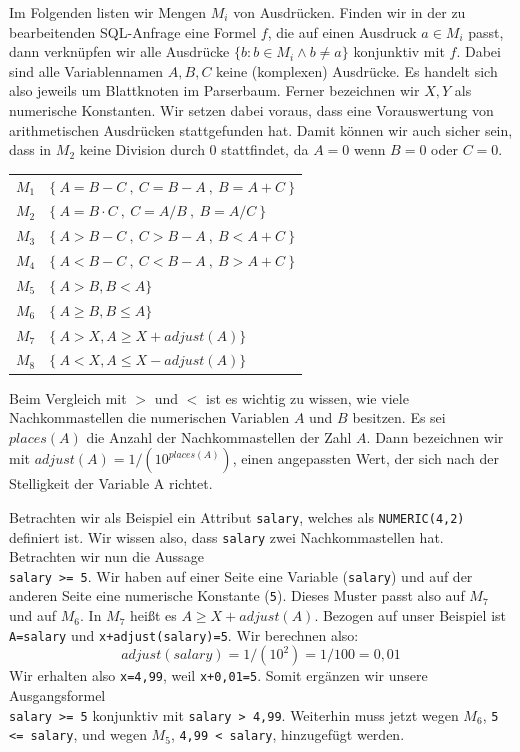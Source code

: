 Im Folgenden listen wir Mengen $M_i$ von Ausdrücken. Finden wir in der zu bearbeitenden SQL-Anfrage eine Formel $f$, die auf einen Ausdruck $a\in M_i$ passt, dann verknüpfen wir alle Ausdrücke $\{b : b\in M_i \wedge b \neq a\}$ konjunktiv mit $f$. Dabei sind alle Variablennamen $A,B,C$ keine (komplexen) Ausdrücke. Es handelt sich also jeweils um Blattknoten im Parserbaum. Ferner bezeichnen wir $X,Y$ als numerische Konstanten. Wir setzen dabei voraus, dass eine Vorauswertung von arithmetischen Ausdrücken stattgefunden hat. Damit können wir auch sicher sein, dass in $M_2$ keine Division durch 0 stattfindet, da $A=0$ wenn $B=0$ oder $C=0$.\\

\begin{tabular}{ll}
$M_1$ & $\{\ A=B-C\ ,\ C=B-A\ ,\ B=A+C\ \}$\\
$M_2$ & $\{\ A=B\cdot C\ ,\ C=A / B\ ,\ B=A / C\ \}$\\
$M_3$ & $\{\ A>B-C\ ,\ C>B-A\ ,\ B<A+C\ \}$\\
$M_4$ & $\{\ A<B-C\ ,\ C<B-A\ ,\ B>A+C\ \}$\\
$M_5$ & $\{\ A>B, B<A \}$\\
$M_6$ & $\{\ A\geq B, B\leq A \}$\\
$M_7$ & $\{\ A>X, A\geq X+\mathit{adjust}(A) \}$\\
$M_8$ & $\{\ A<X, A\leq X-\mathit{adjust}(A) \}$\\

\end{tabular}

Beim Vergleich mit $>$ und $<$ ist es wichtig zu wissen, wie viele Nachkommastellen die numerischen Variablen $A$ und $B$ besitzen. Es sei $\mathit{places}(A)$ die Anzahl der Nachkommastellen der Zahl $A$. Dann bezeichnen wir mit $\mathit{adjust}(A) = 1 / (10^{\mathit{places}(A)})$, einen angepassten Wert, der sich nach der Stelligkeit der Variable A richtet.

Betrachten wir als Beispiel ein Attribut \verb|salary|, welches als \verb|NUMERIC(4,2)| definiert ist. Wir wissen also, dass \verb|salary| zwei Nachkommastellen hat. Betrachten wir nun die Aussage\\ \verb|salary >= 5|.
Wir haben auf einer Seite eine Variable (\verb|salary|) und auf der anderen Seite eine numerische Konstante (\verb|5|). Dieses Muster passt also auf $M_7$ und auf $M_6$. In $M_7$ heißt es $A\geq X+\mathit{adjust}(A)$. Bezogen auf unser Beispiel ist \verb|A=salary| und \verb|x+adjust(salary)=5|. Wir berechnen also: 
$$\mathit{adjust}(\mathit{salary}) = 1 / (10^{2}) = 1/100 = 0,01$$
Wir erhalten also \verb|x=4,99|, weil \verb|x+0,01=5|. Somit ergänzen wir unsere Ausgangsformel\\ \verb|salary >= 5| konjunktiv mit \verb|salary > 4,99|. Weiterhin muss jetzt wegen $M_6$, \verb|5 <= salary|, und wegen $M_5$, \verb|4,99 < salary|, hinzugefügt werden.

